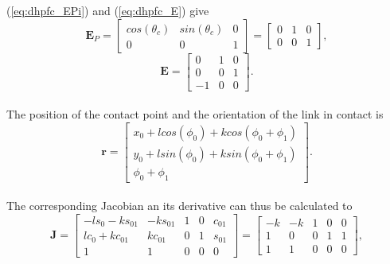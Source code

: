 (\ref{eq:dhpfc_EPi}) and (\ref{eq:dhpfc_E}) give
\begin{equation}
    \mathbf{E}_P = 
    \begin{bmatrix}
        cos(\theta_c) & sin(\theta_c) & 0 \\
        0 & 0 & 1
    \end{bmatrix}=
    \begin{bmatrix}
        0 & 1 & 0 \\
        0 & 0 & 1
    \end{bmatrix},
\end{equation}
\begin{equation}
    \mathbf{E}=
    \begin{bmatrix}
        0 & 1 & 0 \\
        0 & 0 & 1 \\
        -1 & 0 & 0
    \end{bmatrix}.
\end{equation}
\\
The position of the contact point and the orientation of the link in contact is
\begin{equation}
    \mathbf{r}=
    \begin{bmatrix}
        x_0 + l cos(\phi_0) + k cos(\phi_0+\phi_1)\\
        y_0 + l sin(\phi_0) + k sin(\phi_0+\phi_1)\\
        \phi_0+\phi_1
    \end{bmatrix}.
\end{equation}
\\
The corresponding Jacobian an its derivative can thus be calculated to
\begin{equation}
    \mathbf{J}=
    \begin{bmatrix}
        -l s_0 - k s_{01} & - k s_{01} & 1 & 0 & c_{01} \\
        l c_0 + k c_{01} & k c_{01} & 0 & 1 & s_{01} \\
        1 & 1 & 0 & 0 & 0
    \end{bmatrix}=
    \begin{bmatrix}
        - k & - k & 1 & 0 & 0 \\
        1 &0 & 0 & 1 & 1 \\
        1 & 1 & 0 & 0 & 0
    \end{bmatrix},
\end{equation}
